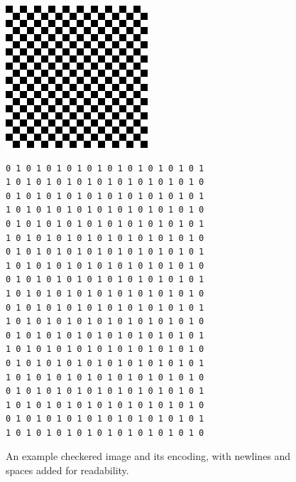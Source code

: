 \begin{figure}%
	\centering%
	\begin{minipage}{0.45\linewidth}%
		\includegraphics[width=\textwidth]{images/checkered_image.jpg}
	\end{minipage}%
	\hspace{.1\linewidth}%
        \begin{minipage}{0.45\linewidth}%
		\scriptsize
\begin{verbatim}
0 1 0 1 0 1 0 1 0 1 0 1 0 1 0 1 0 1 0 1
1 0 1 0 1 0 1 0 1 0 1 0 1 0 1 0 1 0 1 0
0 1 0 1 0 1 0 1 0 1 0 1 0 1 0 1 0 1 0 1
1 0 1 0 1 0 1 0 1 0 1 0 1 0 1 0 1 0 1 0
0 1 0 1 0 1 0 1 0 1 0 1 0 1 0 1 0 1 0 1
1 0 1 0 1 0 1 0 1 0 1 0 1 0 1 0 1 0 1 0
0 1 0 1 0 1 0 1 0 1 0 1 0 1 0 1 0 1 0 1
1 0 1 0 1 0 1 0 1 0 1 0 1 0 1 0 1 0 1 0
0 1 0 1 0 1 0 1 0 1 0 1 0 1 0 1 0 1 0 1
1 0 1 0 1 0 1 0 1 0 1 0 1 0 1 0 1 0 1 0
0 1 0 1 0 1 0 1 0 1 0 1 0 1 0 1 0 1 0 1
1 0 1 0 1 0 1 0 1 0 1 0 1 0 1 0 1 0 1 0
0 1 0 1 0 1 0 1 0 1 0 1 0 1 0 1 0 1 0 1
1 0 1 0 1 0 1 0 1 0 1 0 1 0 1 0 1 0 1 0
0 1 0 1 0 1 0 1 0 1 0 1 0 1 0 1 0 1 0 1
1 0 1 0 1 0 1 0 1 0 1 0 1 0 1 0 1 0 1 0
0 1 0 1 0 1 0 1 0 1 0 1 0 1 0 1 0 1 0 1
1 0 1 0 1 0 1 0 1 0 1 0 1 0 1 0 1 0 1 0
0 1 0 1 0 1 0 1 0 1 0 1 0 1 0 1 0 1 0 1
1 0 1 0 1 0 1 0 1 0 1 0 1 0 1 0 1 0 1 0
\end{verbatim}
    \end{minipage}%
	\caption{An example checkered image and its encoding, with newlines and spaces added for readability.}
	\label{fig:hardware:monitor_image}
\end{figure}

